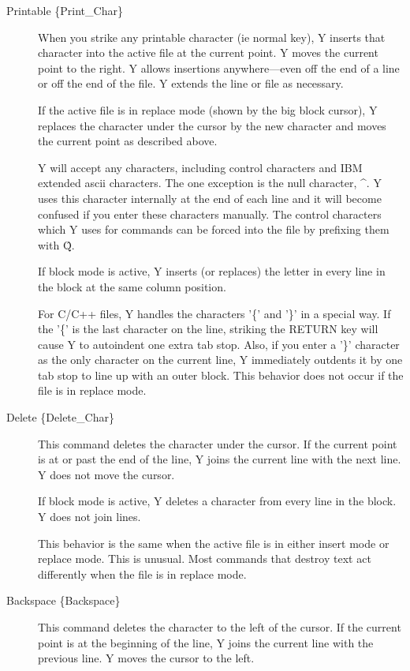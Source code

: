 \begin{description}

\item[Printable \{Print\_Char\}] When you strike any printable character (ie normal key), Y
  inserts that character into the active file at the current point. Y moves the current point to
  the right. Y allows insertions anywhere---even off the end of a line or off the end of the
  file. Y extends the line or file as necessary.

  If the active file is in replace mode (shown by the big block cursor), Y replaces the
  character under the cursor by the new character and moves the current point as described
  above.

  Y will accept any characters, including control characters and IBM extended ascii characters.
  The one exception is the null character, \^\@. Y uses this character internally at the end of
  each line and it will become confused if you enter these characters manually. The control
  characters which Y uses for commands can be forced into the file by prefixing them with \^Q.

  If block mode is active, Y inserts (or replaces) the letter in every line in the block at the
  same column position.

  For C/C++ files, Y handles the characters '\{' and '\}' in a special way. If the '\{' is the
  last character on the line, striking the RETURN key will cause Y to autoindent one extra tab
  stop. Also, if you enter a '\}' character as the only character on the current line, Y
  immediately outdents it by one tab stop to line up with an outer block. This behavior does not
  occur if the file is in replace mode.

\item[Delete \{Delete\_Char\}] This command deletes the character under the cursor. If the
  current point is at or past the end of the line, Y joins the current line with the next line.
  Y does not move the cursor.

  If block mode is active, Y deletes a character from every line in the block. Y does not join
  lines.

  This behavior is the same when the active file is in either insert mode or replace mode. This
  is unusual. Most commands that destroy text act differently when the file is in replace mode.

\item[Backspace \{Backspace\}] This command deletes the character to the left of the cursor. If
  the current point is at the beginning of the line, Y joins the current line with the previous
  line. Y moves the cursor to the left.


\end{description}
